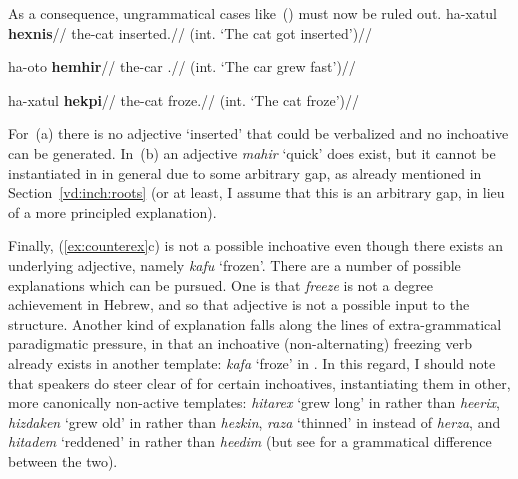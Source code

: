 	\ex\label{tree:vd:thif-inch}
	\xe
\bigskip

As a consequence, ungrammatical cases like~(\nextx) must now be ruled out.
\pex\label{ex:counterex}
	\a \ljudge{*}
		\begingl
		\gla ha-xatul \textbf{hexnis}//
		\glb the-cat inserted.//
		\glft (int. `The cat got inserted')//
	\endgl
	
	\a \ljudge{*}
		\begingl
		\gla ha-oto \textbf{hemhir}//
		\glb the-car .//
		\glft (int. `The car grew fast')//
	\endgl

	\a \ljudge{*}
		\begingl
		\gla ha-xatul \textbf{hekpi}//
		\glb the-cat froze.//
		\glft (int. `The cat froze')//
	\endgl
\xe

For~(\lastx a) there is no adjective `inserted' that could be verbalized and no inchoative can be generated. In~(\lastx b) an adjective \emph{mahir} `quick' does exist, but it cannot be instantiated in {\thif} in general due to some arbitrary gap, as already mentioned in Section~\ref{vd:inch:roots} (or at least, I assume that this is an arbitrary gap, in lieu of a more principled explanation).

Finally, (\ref{ex:counterex}c) is not a possible inchoative even though there exists an underlying adjective, namely \emph{kafu} `frozen'. There are a number of possible explanations which can be pursued. One is that \emph{freeze} is not a degree achievement in Hebrew, and so that adjective is not a possible input to the structure. Another kind of explanation falls along the lines of extra-grammatical paradigmatic pressure, in that an inchoative (non-alternating) freezing verb already exists in another template: \emph{kafa} `froze' in {\tkal}. In this regard, I should note that speakers do steer clear of {\thif} for certain inchoatives, instantiating them in other, more canonically non-active templates: \emph{hitarex} `grew long' in {\thit} rather than \emph{heerix}, \emph{hizdaken} `grew old' in {\thit} rather than \emph{hezkin}, \emph{raza} `thinned' in {\tkal} instead of \emph{herza}, and \emph{hitadem} `reddened' in {\thit} rather than \emph{heedim} (but see \citealt[22]{doron03} for a grammatical difference between the two).

